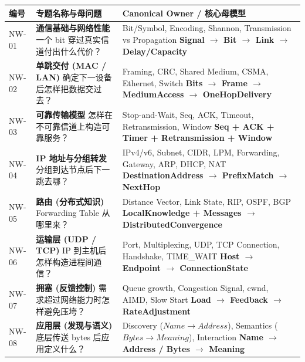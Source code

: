 \documentclass[11pt,a4paper,openany]{ctexbook}
\newcommand{\key}[1]{\textbf{\color{deep}#1}}
\begin{document}
\begin{longtable}{p{1.5cm}p{4.5cm}p{\dimexpr\linewidth-6.87cm\relax}}
\toprule
\textbf{编号} & \textbf{专题名称与母问题} & \textbf{Canonical Owner / 核心母模型}\\
\midrule
NW-01 & \textbf{通信基础与网络性能} \newline 一个 bit 穿过真实信道付出什么代价？ & Bit/Symbol, Encoding, Shannon, Transmission vs Propagation \newline \key{Signal $\rightarrow$ Bit $\rightarrow$ Link $\rightarrow$ Delay/Capacity} \\
\midrule
NW-02 & \textbf{单跳交付 (MAC / LAN)} \newline 确定下一设备后怎样把数据交过去？ & Framing, CRC, Shared Medium, CSMA, Ethernet, Switch \newline \key{Bits $\rightarrow$ Frame $\rightarrow$ MediumAccess $\rightarrow$ OneHopDelivery} \\
\midrule
NW-03 & \textbf{可靠传输模型} \newline 怎样在不可靠信道上构造可靠服务？ & Stop-and-Wait, Seq, ACK, Timeout, Retransmission, Window \newline \key{Seq + ACK + Timer + Retransmission + Window} \\
\midrule
NW-04 & \textbf{IP 地址与分组转发} \newline 分组到达节点后下一跳去哪？ & IPv4/v6, Subnet, CIDR, LPM, Forwarding, Gateway, ARP, DHCP, NAT \newline \key{DestinationAddress $\rightarrow$ PrefixMatch $\rightarrow$ NextHop} \\
\midrule
NW-05 & \textbf{路由 (分布式知识)} \newline Forwarding Table 从哪里来？ & Distance Vector, Link State, RIP, OSPF, BGP \newline \key{LocalKnowledge + Messages $\rightarrow$ DistributedConvergence} \\
\midrule
NW-06 & \textbf{运输层 (UDP / TCP)} \newline IP 到主机后怎样构造进程间通信？ & Port, Multiplexing, UDP, TCP Connection, Handshake, TIME\_WAIT \newline \key{Host $\rightarrow$ Endpoint $\rightarrow$ ConnectionState} \\
\midrule
NW-07 & \textbf{拥塞 (反馈控制)} \newline 需求超过网络能力时怎样避免压垮？ & Queue growth, Congestion Signal, cwnd, AIMD, Slow Start \newline \key{Load $\rightarrow$ Feedback $\rightarrow$ RateAdjustment} \\
\midrule
NW-08 & \textbf{应用层 (发现与语义)} \newline 底层传送 bytes 后应用定义什么？ & Discovery ($Name \rightarrow Address$), Semantics ($Bytes \rightarrow Meaning$), Interaction \newline \key{Name $\rightarrow$ Address / Bytes $\rightarrow$ Meaning} \\
\bottomrule
\end{longtable}
\end{document}
